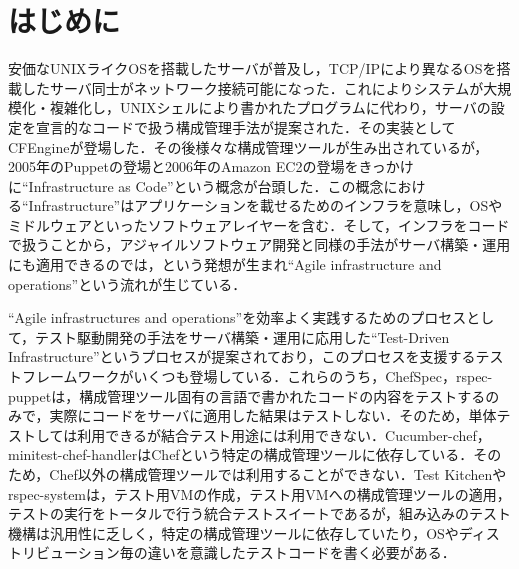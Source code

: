 \section{はじめに}

安価なUNIXライクOSを搭載したサーバが普及し，TCP/IPにより異なるOSを搭載したサーバ同士がネットワーク接続可能になった．これによりシステムが大規模化・複雑化し，UNIXシェルにより書かれたプログラムに代わり，サーバの設定を宣言的なコードで扱う構成管理手法が提案された．その実装としてCFEngine\cite{cfengine}が登場した．その後様々な構成管理ツールが生み出されているが\cite{cmt}，2005年のPuppetの登場\cite{puppet}と2006年のAmazon EC2の登場\cite{ec2}をきっかけに``Infrastructure as Code''という概念が台頭した．この概念における``Infrastructure''はアプリケーションを載せるためのインフラを意味し，OSやミドルウェアといったソフトウェアレイヤーを含む．そして，インフラをコードで扱うことから，アジャイルソフトウェア開発\cite{agile_manifesto}と同様の手法がサーバ構築・運用にも適用できるのでは，という発想が生まれ``Agile infrastructure and operations''\cite{agile_infrastructure}という流れが生じている．

``Agile infrastructures and operations''を効率よく実践するためのプロセスとして，テスト駆動開発\cite{test_driven_development}の手法をサーバ構築・運用に応用した``Test-Driven Infrastructure''\cite{test_driven_infrastructure_with_chef}というプロセスが提案されており，このプロセスを支援するテストフレームワークがいくつも登場している\cite{chefspec}\cite{rspec-puppet}\cite{cucumber-chef}\cite{minitest-chef-handler}\cite{test-kitchen}\cite{rspec-system}．これらのうち，ChefSpec\cite{chefspec}，rspec-puppet\cite{rspec-puppet}は，構成管理ツール固有の言語で書かれたコードの内容をテストするのみで，実際にコードをサーバに適用した結果はテストしない．そのため，単体テストしては利用できるが結合テスト用途には利用できない．Cucumber-chef\cite{cucumber-chef}，minitest-chef-handler\cite{minitest-chef-handler}はChefという特定の構成管理ツールに依存している．そのため，Chef以外の構成管理ツールでは利用することができない．Test Kitchen\cite{test-kitchen}やrspec-system\cite{rspec-system}は，テスト用VMの作成，テスト用VMへの構成管理ツールの適用，テストの実行をトータルで行う統合テストスイートであるが，組み込みのテスト機構は汎用性に乏しく，特定の構成管理ツールに依存していたり，OSやディストリビューション毎の違いを意識したテストコードを書く必要がある．

